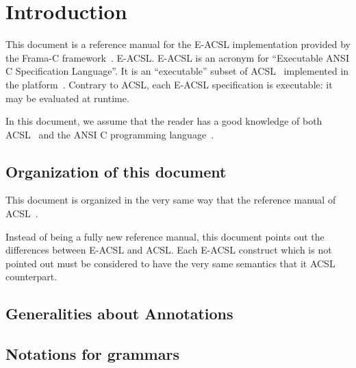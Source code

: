 \chapter{Introduction}

This document is a reference manual for
%
{the E-ACSL implementation provided by the Frama-C
  framework~\cite{frama-c}.}%
{E-ACSL.}
E-ACSL is an acronym for ``Executable ANSI C
Specification Language''. It is an ``executable'' subset of
ACSL~\cite{acsl} implemented in the \framac platform~\cite{framac}. Contrary to
ACSL, each E-ACSL specification is executable: it may be evaluated at runtime.

In this document, we assume that the reader has a good knowledge of both
ACSL~\cite{acsl} and the ANSI C programming language~\cite{KR88,standardc99}.

\section{Organization of this document}

This document is organized in the very same way that the reference manual of
ACSL~\cite{acsl}.

Instead of being a fully new reference manual, this document points out the
differences between E-ACSL and ACSL. Each E-ACSL construct which is not
pointed out must be considered to have the very same semantics that it ACSL
counterpart.

\section{Generalities about Annotations}\label{sec:gener-about-annot}
\nodiff

\section{Notations for grammars}
\nodiff
